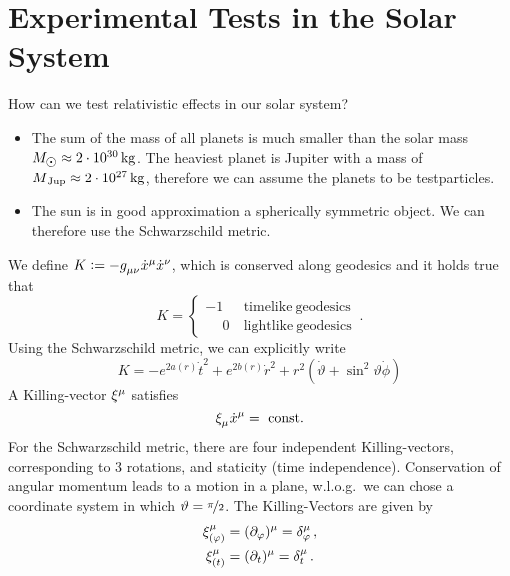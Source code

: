 \chapter{Experimental Tests in the Solar System}
How can we test relativistic effects in our solar system?
\begin{itemize}
  \item The sum of the mass of all planets is much smaller than the solar mass
  $M_{\astrosun}\approx \unit[2\cdot 10^{30}]{kg}$. The heaviest planet is
  Jupiter with a mass of $M\textsubscript{Jup}\approx \unit[2\cdot
  10^{27}]{kg}$, therefore we can assume the planets to be testparticles.
  \item The sun is in good approximation a spherically symmetric object. We can
  therefore use the Schwarzschild metric.
\end{itemize}
We define
$K:=-\tensor{g}{_\mu_\nu}\tensor{\dot{x}}{^\mu}\tensor{\dot{x}}{^\nu}$, which is
conserved along geodesics and it holds true that
\begin{equation}
K=\begin{cases}
-1& \mathrm{\ timelike\ geodesics}\\
\phantom{-}0& \mathrm{\ lightlike\ geodesics}
\end{cases}\,.
\end{equation}
Using the Schwarzschild metric, we can explicitly write
\begin{equation}
K=-e^{2a(r)}\dot{t}^2+e^{2b(r)}\dot{r}^2+r^2\left(\dot{\vartheta}+\sin^2\vartheta
\dot{\phi}\right)
\end{equation}
A Killing-vector $\tensor{\xi}{^\mu}$ satisfies
\begin{equation}
\tensor{\xi}{_\mu}\tensor{\dot{x}}{^\mu}=\mathrm{\ const.}
\end{equation}
For the Schwarzschild metric, there are four independent Killing-vectors,
corresponding to 3 rotations, and staticity (time independence).
Conservation of angular momentum leads to a motion in a plane, w.l.o.g.\ we can
chose a coordinate system in which $\vartheta=\nicefrac{\pi}{2}$.
The Killing-Vectors are given by
\begin{align}
\tensor*{\xi}{_{(\varphi)}^\mu}&=(\partial_\varphi)^\mu=\tensor*{\delta}{_\varphi^\mu}\,,\\
\tensor*{\xi}{_{(t)}^\mu}&=(\partial_t)^\mu=\tensor*{\delta}{_t^\mu}\,.
\end{align}
